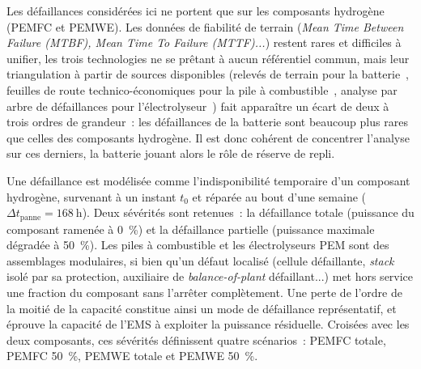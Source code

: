 Les défaillances considérées ici ne portent que sur les composants hydrogène (PEMFC et PEMWE). Les données de fiabilité de terrain (\textit{Mean Time Between Failure (MTBF), Mean Time To Failure (MTTF)...}) restent rares et difficiles à unifier, les trois technologies ne se prêtant à aucun référentiel commun, mais leur triangulation à partir de sources disponibles (relevés de terrain pour la batterie~\cite{ieee_std_493_2007}, feuilles de route technico-économiques pour la pile à combustible~\cite{fch2ju_mawp_2018}, analyse par arbre de défaillances pour l'électrolyseur~\cite{ubale_failure_2025}) fait apparaître un écart de deux à trois ordres de grandeur~: les défaillances de la batterie sont beaucoup plus rares que celles des composants hydrogène. Il est donc cohérent de concentrer l'analyse sur ces derniers, la batterie jouant alors le rôle de réserve de repli.

Une défaillance est modélisée comme l'indisponibilité temporaire d'un composant hydrogène, survenant à un instant $t_0$ et réparée au bout d'une semaine ($\Delta t_{\text{panne}} = \SI{168}{\hour}$). Deux sévérités sont retenues~: la défaillance totale (puissance du composant ramenée à \SI{0}{\percent}) et la défaillance partielle (puissance maximale dégradée à \SI{50}{\percent}). Les piles à combustible et les électrolyseurs PEM sont des assemblages modulaires, si bien qu'un défaut localisé (cellule défaillante, \textit{stack} isolé par sa protection, auxiliaire de \textit{balance-of-plant} défaillant...) met hors service une fraction du composant sans l'arrêter complètement. Une perte de l'ordre de la moitié de la capacité constitue ainsi un mode de défaillance représentatif, et éprouve la capacité de l'EMS à exploiter la puissance résiduelle. Croisées avec les deux composants, ces sévérités définissent quatre scénarios~: PEMFC totale, PEMFC \SI{50}{\percent}, PEMWE totale et PEMWE \SI{50}{\percent}.

